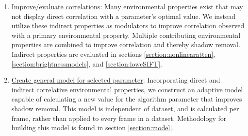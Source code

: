 \begin{enumerate}
\item \underline{Improve/evaluate correlations}: Many environmental properties exist that may not display direct correlation with a parameter's optimal value. We instead utilize these indirect properties as modulators to improve correlation observed with a primary environmental property. Multiple contributing environmental properties are combined to improve correlation and thereby shadow removal. Indirect properties are evaluated in sections \ref{section:nonlinearatten}, \ref{section:brightnessmodels}, and \ref{section:lowcSIFT}.

\item \underline{Create general model for selected parameter}: Incorporating direct and indirect correlative environmental properties, we construct an adaptive model capable of calculating a new value for the algorithm parameter that improves shadow removal. This model is independent of dataset, and is calculated per frame, rather than applied to every frame in a dataset. Methodology for building this model is found in section \ref{section:model}.
\end{enumerate}